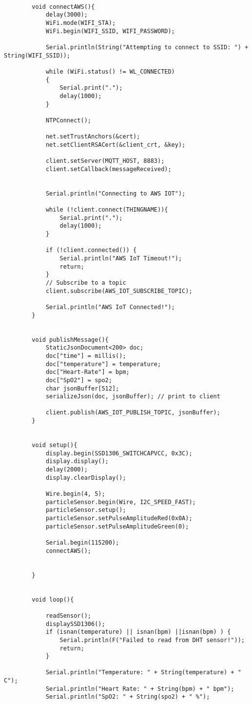 \begin{flushleft}
\begin{lstlisting}[style=CStyle]
		
		void connectAWS(){
			delay(3000);
			WiFi.mode(WIFI_STA);
			WiFi.begin(WIFI_SSID, WIFI_PASSWORD);
			
			Serial.println(String("Attempting to connect to SSID: ") + String(WIFI_SSID));
			
			while (WiFi.status() != WL_CONNECTED)
			{
				Serial.print(".");
				delay(1000);
			}
			
			NTPConnect();
			
			net.setTrustAnchors(&cert);
			net.setClientRSACert(&client_crt, &key);
			
			client.setServer(MQTT_HOST, 8883);
			client.setCallback(messageReceived);
			
			
			Serial.println("Connecting to AWS IOT");
			
			while (!client.connect(THINGNAME)){
				Serial.print(".");
				delay(1000);
			}
			
			if (!client.connected()) {
				Serial.println("AWS IoT Timeout!");
				return;
			}
			// Subscribe to a topic
			client.subscribe(AWS_IOT_SUBSCRIBE_TOPIC);
			
			Serial.println("AWS IoT Connected!");
		}
		
		
		void publishMessage(){
			StaticJsonDocument<200> doc;
			doc["time"] = millis();
			doc["temperature"] = temperature;
			doc["Heart-Rate"] = bpm;
			doc["SpO2"] = spo2;
			char jsonBuffer[512];
			serializeJson(doc, jsonBuffer); // print to client
			
			client.publish(AWS_IOT_PUBLISH_TOPIC, jsonBuffer);
		}
		
		
		void setup(){
			display.begin(SSD1306_SWITCHCAPVCC, 0x3C);
			display.display();
			delay(2000);
			display.clearDisplay();
			
			Wire.begin(4, 5);
			particleSensor.begin(Wire, I2C_SPEED_FAST);
			particleSensor.setup();
			particleSensor.setPulseAmplitudeRed(0x0A);
			particleSensor.setPulseAmplitudeGreen(0);
			
			Serial.begin(115200);
			connectAWS();
			
			
		}
		
		
		void loop(){
			
			readSensor();
			displaySSD1306();
			if (isnan(temperature) || isnan(bpm) ||isnan(bpm) ) {
				Serial.println(F("Failed to read from DHT sensor!"));
				return;
			}
			
			Serial.println("Temperature: " + String(temperature) + " C");
			Serial.println("Heart Rate: " + String(bpm) + " bpm");
			Serial.println("SpO2: " + String(spo2) + " %");
			

\end{lstlisting}
\end{flushleft}
